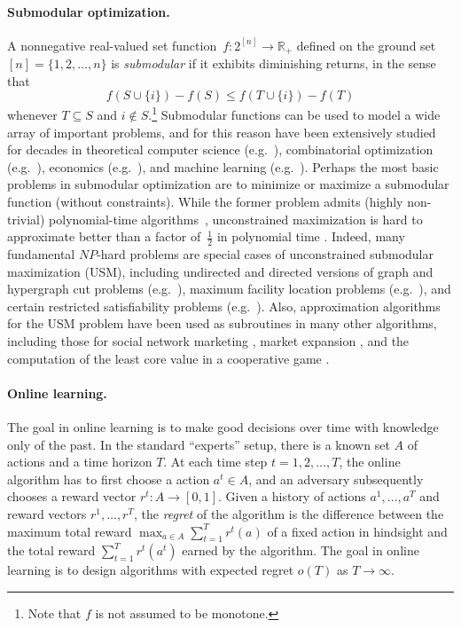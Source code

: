 \documentclass[final,12pt]{colt2018}
\newcommand{\RR}{\mathbb{R}}
\begin{document}
\paragraph{Submodular optimization.}
A nonnegative real-valued set function~$f:2^{[n]} \rightarrow \RR_+$ 
defined on the ground set $[n] = \{1,2,\ldots,n\}$
is {\em submodular}
if it exhibits diminishing returns, in the sense that
\[
f(S \cup \{i\}) - f(S) \le f(T \cup \{i\})-f(T)
\]
whenever $T \subseteq S$ and $i \notin S$.\footnote{Note that $f$ is
  not assumed to be monotone.}  Submodular functions can be used to
model a wide array of important problems, and for this reason have
been extensively studied for decades in theoretical computer science
(e.g.~\cite{shaddin}), combinatorial optimization
(e.g.~\cite{vondrak}), economics (e.g.~\cite{milgrom}), and machine
learning (e.g.~\cite{bach13}).  Perhaps the most basic problems in
submodular optimization are to minimize or maximize a submodular
function (without constraints).  While the former problem admits
(highly non-trivial) polynomial-time
algorithms~\citep{GLS88,IFF01,S00}, unconstrained maximization is hard
to approximate better than a factor of~$\tfrac 12$ in polynomial time
\citep{FMV11,DV12}.  Indeed, many fundamental $NP$-hard problems are
special cases of unconstrained submodular maximization (USM),
including undirected and directed versions of graph and hypergraph cut
problems (e.g.~\cite{GW95,HZ01}), maximum facility location problems
(e.g.~\cite{AS99}), and certain restricted satisfiability problems
(e.g.~\cite{GK05}).  Also, approximation algorithms for the USM
problem have been used as subroutines in many other algorithms,
including those for social network marketing \citep{HMS08}, market
expansion \citep{revsub}, and the computation of the least core value
in a cooperative game \citep{SU13}.

\paragraph{Online learning.}
The goal in online learning is to make good decisions over time with
knowledge only of the past.  In the standard ``experts'' setup,
there
is a known set $A$ of actions and a time horizon $T$.  At each time
step $t=1,2,\ldots,T$, the online algorithm has to first choose a
action $a^t \in A$, and an adversary subsequently chooses a reward
vector $r^t:A \rightarrow [0,1]$.
Given a history of actions $a^1,\ldots,a^T$
and reward vectors $r^1,\ldots,r^T$,
the {\em regret} of the algorithm is the
difference between the maximum total reward $\max_{a \in A}
\sum_{t=1}^T r^t(a)$ of a fixed action in hindsight
and the total reward $\sum_{t=1}^T r^t(a^t)$ earned by the algorithm.
The goal in online learning is to design algorithms with expected
regret $o(T)$ as $T \rightarrow \infty$.
\end{document}
